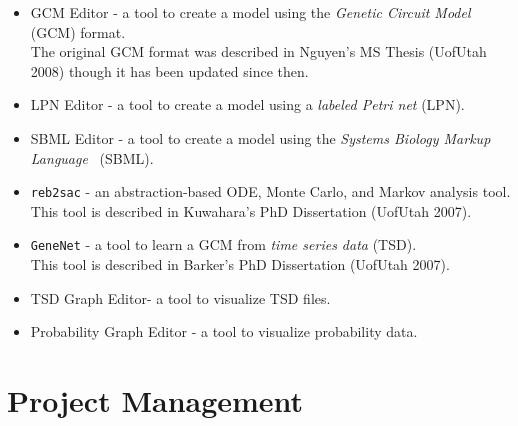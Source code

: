 \documentclass[titlepage,11pt]{article}
\begin{document}
\begin{itemize}
\item GCM Editor - a tool to create a model using the 
\emph{Genetic Circuit Model} (GCM) format.\\ 
The original GCM format was described in
Nguyen's MS Thesis
(UofUtah 2008) though it has been updated since then.
\item LPN Editor - a tool to create a model using a \emph{labeled Petri net} (LPN).
\item SBML Editor - a tool to create a model using the 
\emph{Systems Biology Markup Language}
~(SBML). 
\item {\tt reb2sac} - an abstraction-based ODE, Monte Carlo, and Markov analysis tool.
\\
This tool is described in 
Kuwahara's PhD Dissertation
(UofUtah 2007).
\item {\tt GeneNet} - a tool to learn a GCM from \emph{time series
    data} (TSD).\\
This tool is described in 
Barker's PhD Dissertation
(UofUtah 2007).
\item TSD Graph Editor- a tool to visualize TSD files. 
\item Probability Graph Editor - a tool to visualize probability data. 
\end{itemize}

\section{Project Management}
\end{document}
